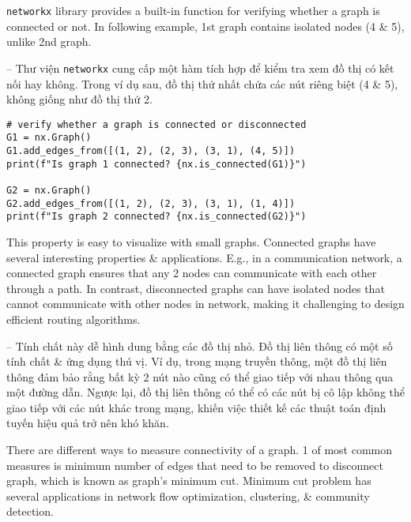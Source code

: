\documentclass{article}
\begin{document}
\begin{itemize}
\begin{itemize}
        {\tt networkx} library provides a built-in function for verifying whether a graph is connected or not. In following example, 1st graph contains isolated nodes (4 \& 5), unlike 2nd graph.

        -- Thư viện {\tt networkx} cung cấp một hàm tích hợp để kiểm tra xem đồ thị có kết nối hay không. Trong ví dụ sau, đồ thị thứ nhất chứa các nút riêng biệt (4 \& 5), không giống như đồ thị thứ 2.
        \begin{verbatim}
# verify whether a graph is connected or disconnected
G1 = nx.Graph()
G1.add_edges_from([(1, 2), (2, 3), (3, 1), (4, 5)])
print(f"Is graph 1 connected? {nx.is_connected(G1)}")

G2 = nx.Graph()
G2.add_edges_from([(1, 2), (2, 3), (3, 1), (1, 4)])
print(f"Is graph 2 connected? {nx.is_connected(G2)}")
        \end{verbatim}
        This property is easy to visualize with small graphs. Connected graphs have several interesting properties \& applications. E.g., in a communication network, a connected graph ensures that any 2 nodes can communicate with each other through a path. In contrast, disconnected graphs can have isolated nodes that cannot communicate with other nodes in network, making it challenging to design efficient routing algorithms.

        -- Tính chất này dễ hình dung bằng các đồ thị nhỏ. Đồ thị liên thông có một số tính chất \& ứng dụng thú vị. Ví dụ, trong mạng truyền thông, một đồ thị liên thông đảm bảo rằng bất kỳ 2 nút nào cũng có thể giao tiếp với nhau thông qua một đường dẫn. Ngược lại, đồ thị liên thông có thể có các nút bị cô lập không thể giao tiếp với các nút khác trong mạng, khiến việc thiết kế các thuật toán định tuyến hiệu quả trở nên khó khăn.

        There are different ways to measure connectivity of a graph. 1 of most common measures is minimum number of edges that need to be removed to disconnect graph, which is known as graph's minimum cut. Minimum cut problem has several applications in network flow optimization, clustering, \& community detection.


\end{itemize}
\end{itemize}
\end{document}
